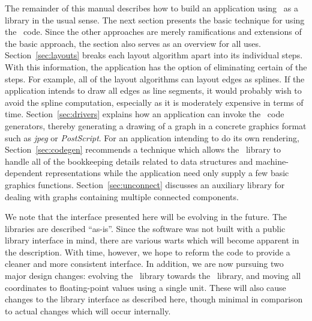 The remainder of this manual describes how to build an application
using \gviz\ as a library in the usual sense.
The next section presents the basic technique for using the \gviz\ code. Since
the other approaches are merely ramifications and extensions of the
basic approach, the section also serves as an overview for all uses.
Section~\ref{sec:layouts} breaks each layout algorithm apart into 
its individual steps.
With this information, the application has the option of eliminating
certain of the steps. For example, all of the layout algorithms can 
layout edges as splines. If the application intends to draw all edges
as line segments, it would probably wish to avoid the spline computation,
especially as it is moderately expensive in terms of time. 
Section~\ref{sec:drivers} explains how an application can invoke the
\gviz\ code generators, thereby generating a drawing of a graph in 
a concrete graphics format such as {\em jpeg} or {\em PostScript}.
For an application intending to do its own rendering,
Section~\ref{sec:codegen} recommends a technique which allows the
\gviz\ library to handle all of the bookkeeping details related to
data structures and machine-dependent representations while the
application need only supply a few basic graphics functions.
Section~\ref{sec:unconnect}
discusses an auxiliary library for dealing with graphs containing
multiple connected components.

We note that the interface presented here will be evolving in the
future.
The libraries are described ``as-is''. Since the software was not
built with a public library interface in mind, there are various warts
which will become apparent in the description. With time, however,
we hope to reform the code to provide a cleaner and more consistent
interface. In addition, we are now pursuing two major design changes:
evolving the \graph\ library towards the \agraph\ library,
and moving all coordinates to floating-point
values using a single unit. These will also cause changes to the
library interface as described here, though minimal in comparison to
actual changes which will occur internally.

